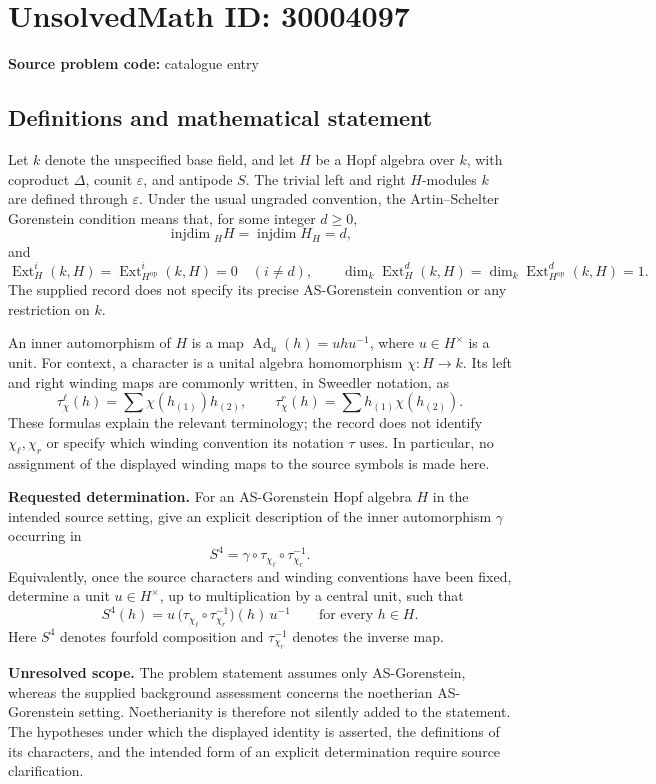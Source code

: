 \documentclass[11pt]{article}
\begin{document}
\section*{UnsolvedMath ID: 30004097}
\textbf{Source problem code:} catalogue entry
\subsection{Definitions and mathematical statement}
Let \(k\) denote the unspecified base field, and let \(H\) be a Hopf algebra over \(k\), with coproduct \(\Delta\), counit \(\varepsilon\), and antipode \(S\). The trivial left and right \(H\)-modules \(k\) are defined through \(\varepsilon\). Under the usual ungraded convention, the Artin--Schelter Gorenstein condition means that, for some integer \(d\geq 0\),
\[
\operatorname{injdim}{}_H H=\operatorname{injdim}H_H=d,
\]
and
\[
\operatorname{Ext}^i_H(k,H)=\operatorname{Ext}^i_{H^{\mathrm{op}}}(k,H)=0\quad(i\neq d),
\qquad
\dim_k\operatorname{Ext}^d_H(k,H)=\dim_k\operatorname{Ext}^d_{H^{\mathrm{op}}}(k,H)=1.
\]
The supplied record does not specify its precise AS-Gorenstein convention or any restriction on \(k\).

An inner automorphism of \(H\) is a map \(\operatorname{Ad}_u(h)=uhu^{-1}\), where \(u\in H^\times\) is a unit. For context, a character is a unital algebra homomorphism \(\chi:H\to k\). Its left and right winding maps are commonly written, in Sweedler notation, as
\[
\tau^\ell_\chi(h)=\sum\chi(h_{(1)})h_{(2)},
\qquad
\tau^r_\chi(h)=\sum h_{(1)}\chi(h_{(2)}).
\]
These formulas explain the relevant terminology; the record does not identify \(\chi_\ell,\chi_r\) or specify which winding convention its notation \(\tau\) uses. In particular, no assignment of the displayed winding maps to the source symbols is made here.

\textbf{Requested determination.} For an AS-Gorenstein Hopf algebra \(H\) in the intended source setting, give an explicit description of the inner automorphism \(\gamma\) occurring in
\[
S^4=\gamma\circ\tau_{\chi_\ell}\circ\tau_{\chi_r}^{-1}.
\]
Equivalently, once the source characters and winding conventions have been fixed, determine a unit \(u\in H^\times\), up to multiplication by a central unit, such that
\[
S^4(h)=u\,\bigl(\tau_{\chi_\ell}\circ\tau_{\chi_r}^{-1}\bigr)(h)\,u^{-1}
\qquad\text{for every }h\in H.
\]
Here \(S^4\) denotes fourfold composition and \(\tau_{\chi_r}^{-1}\) denotes the inverse map.

\textbf{Unresolved scope.} The problem statement assumes only AS-Gorenstein, whereas the supplied background assessment concerns the noetherian AS-Gorenstein setting. Noetherianity is therefore not silently added to the statement. The hypotheses under which the displayed identity is asserted, the definitions of its characters, and the intended form of an explicit determination require source clarification.
\end{document}
